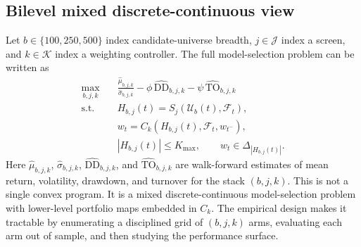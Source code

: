 \documentclass[11pt,a4paper]{article}
\begin{document}
\subsection{Bilevel mixed discrete-continuous view}
Let $b\in\{100,250,500\}$ index candidate-universe breadth, $j\in\mathcal{J}$ index a screen, and $k\in\mathcal{K}$ index a weighting controller. The full model-selection problem can be written as
\begin{equation}
\begin{aligned}
\max_{b,j,k}\quad & \frac{\widehat{\mu}_{b,j,k}}{\widehat{\sigma}_{b,j,k}} - \phi\,\widehat{\text{DD}}_{b,j,k} - \psi\,\widehat{\text{TO}}_{b,j,k}\\
\text{s.t.}\quad & H_{b,j}(t)=S_j(\mathcal{U}_b(t),\mathcal{F}_t),\\
& w_t=C_k(H_{b,j}(t),\mathcal{F}_t,w_{t^-}),\\
& |H_{b,j}(t)|\le K_{\max},\qquad w_t\in\Delta_{|H_{b,j}(t)|}.
\end{aligned}
\label{eq:bilevel_stack}
\end{equation}
Here $\widehat{\mu}_{b,j,k}$, $\widehat{\sigma}_{b,j,k}$, $\widehat{\text{DD}}_{b,j,k}$, and $\widehat{\text{TO}}_{b,j,k}$ are walk-forward estimates of mean return, volatility, drawdown, and turnover for the stack $(b,j,k)$. This is not a single convex program. It is a mixed discrete-continuous model-selection problem with lower-level portfolio maps embedded in $C_k$. The empirical design makes it tractable by enumerating a disciplined grid of $(b,j,k)$ arms, evaluating each arm out of sample, and then studying the performance surface.
\end{document}
